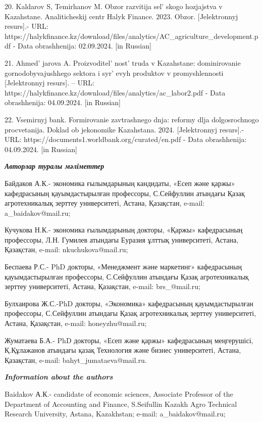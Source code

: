 {{20. Kaldarov S, Temirhanov M. Obzor razvitija sel' skogo
hozjajstva v Kazahstane. Analiticheskij centr Halyk Finance. 2023.
Obzor. {[}Jelektronnyj resurs{]}.- URL:
https://halykfinance.kz/download/files/analytics/AC\_agriculture\_development.pdf
- Data obrashhenija: 02.09.2024. {[}in Russian{]}

21. Ahmed' jarova A.
Proizvoditel' nost'{} truda v Kazahstane:
dominirovanie gornodobyvajushhego sektora i syr' evyh
produktov v promyshlennosti {[}Jelektronnyj resurs{]}. -- URL:
https://halykfinance.kz/download/files/analytics/ac\_labor2.pdf - Data
obrashhenija: 04.09.2024. {[}in Russian{]}

22. Vsemirnyj bank. Formirovanie zavtrashnego dnja: reformy dlja
dolgosrochnogo procvetanija. Doklad ob jekonomike Kazahstana. 2024.
{[}Jelektronnyj resurs{]}.- URL:
https://documents1.worldbank.org/curated/en.pdf - Data obrashhenija:
04.09.2024. {[}in Russian{]}

\emph{{\bfseries Авторлар туралы мәліметтер}}

Байдаков А.К.- экономика ғылымдарының кандидаты, «Есеп және қаржы»
кафедрасының қауымдастырылған профессоры, С.Сейфуллин атындағы Қазақ
агротехникалық зерттеу университеті, Астана, Қазақстан, e-mail:
a\_baidakov@mail.ru;

Кучукова Н.К.- экономика ғылымдарының докторы, «Қаржы» кафедрасының
профессоры, Л.Н. Гумилев атындағы Еуразия ұлттық университеті, Астана,
Қазақстан, e-mail: nkuchukova@mail.ru;

Беспаева Р.С.- PhD докторы, «Менеджмент және маркетинг» кафедрасының
қауымдастырылған профессоры, С.Сейфуллин атындағы Қазақ агротехникалық
зерттеу университеті, Астана, Қазақстан, e-mail: brs\_@mail.ru;

Булхаирова Ж.С.-PhD докторы, «Экономика» кафедрасының қауымдастырылған
профессоры, С.Сейфуллин атындағы Қазақ агротехникалық зерттеу
университеті, Астана, Қазақстан, e-mail: honeyzhu@mail.ru;

Жуматаева Б.А.- PhD докторы, «Есеп және қаржы» кафедрасының меңгерушісі,
Қ.Құлажанов атындағы қазақ Технология және бизнес университеті, Астана,
Қазақстан, e-mail: bahyt\_jumataeva@mail.ru.

\emph{{\bfseries Information about the authors}}

Baidakov А.К.- candidate of economic sciences, Associate Professor of
the Department of Accounting and Finance, S.Seifullin Kazakh Agro
Technical Research University, Astana, Kazakhstan; e-mail:
a\_baidakov@mail.ru;

}}
